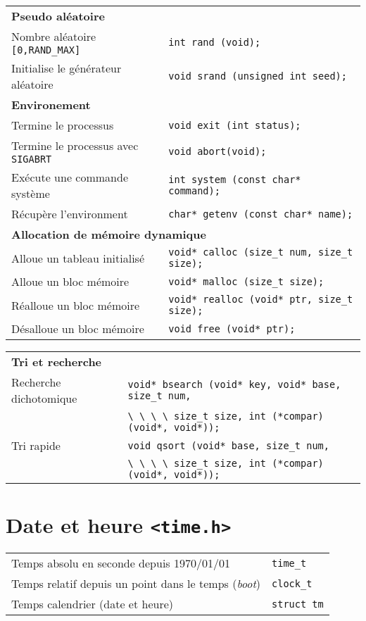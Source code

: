 \documentclass{article}
\newcommand{\cd}{\lstinline}
\begin{document}
\begin{multicols*}{3}
\begin{tabularx}{\linewidth}{Xl}
  \multicolumn{2}{l}{\bf Pseudo aléatoire} \rule{0pt}{3ex}\\
  Nombre aléatoire \cd{[0,RAND_MAX]} & \cd{int rand (void);} \\
  Initialise le générateur aléatoire & \cd{void srand (unsigned int seed);} \\

  \multicolumn{2}{l}{\bf Environement} \rule{0pt}{3ex}\\
  Termine le processus & \cd{void exit (int status);} \\
  Termine le processus avec \cd{SIGABRT} & \cd{void abort(void);} \\
  Exécute une commande système & \cd{int system (const char* command);} \\
  Récupère l'environment & \cd{char* getenv (const char* name);} \\

  \multicolumn{2}{l}{\bf Allocation de mémoire dynamique} \rule{0pt}{3ex} \\
  Alloue un tableau initialisé & \cd{void* calloc (size_t num, size_t size);} \\
  Alloue un bloc mémoire & \cd{void* malloc (size_t size);} \\
  Réalloue un bloc mémoire & \cd{void* realloc (void* ptr, size_t size);} \\
  Désalloue un bloc mémoire & \cd{void free (void* ptr);} \\
\end{tabularx}
\begin{tabularx}{\linewidth}{Xl}
  \multicolumn{2}{l}{\bf Tri et recherche} \rule{0pt}{3ex} \\
  Recherche dichotomique & \cd{void* bsearch (void* key, void* base, size_t num,} \\
                         & \cd{\ \ \ \ size_t size, int (*compar)(void*, void*));} \\
  Tri rapide             & \cd{void qsort (void* base, size_t num,} \\
                         & \cd{\ \ \ \ size_t size, int (*compar)(void*, void*));} \\
\end{tabularx}

\section*{Date et heure \texttt{<time.h>}}
\begin{tabularx}{\linewidth}{Xl}
  Temps absolu en seconde depuis 1970/01/01 & \cd{time_t} \\
  Temps relatif depuis un point dans le temps (\emph{boot}) & \cd{clock_t} \\
  Temps calendrier (date et heure) & \cd{struct tm} \\
\end{tabularx}


\end{multicols*}
\end{document}
